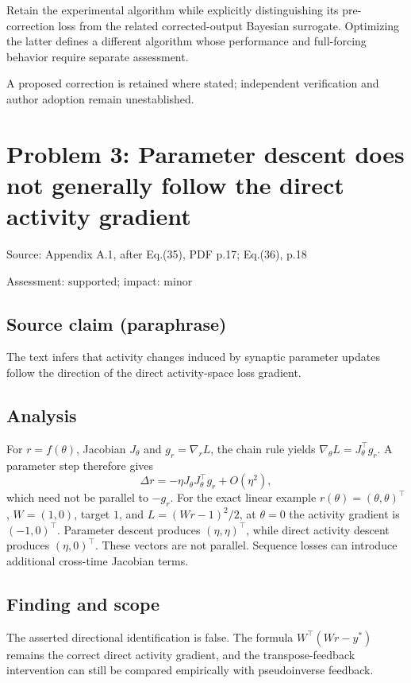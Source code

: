\documentclass[11pt]{article}
\begin{document}
Retain the experimental algorithm while explicitly distinguishing its pre-correction loss from the related corrected-output Bayesian surrogate. Optimizing the latter defines a different algorithm whose performance and full-forcing behavior require separate assessment.

A proposed correction is retained where stated; independent verification and author adoption remain unestablished.

\section*{Problem 3: Parameter descent does not generally follow the direct activity gradient}

Source: Appendix A.1, after Eq.(35), PDF p.17; Eq.(36), p.18

Assessment: supported; impact: minor

\subsection*{Source claim (paraphrase)}

The text infers that activity changes induced by synaptic parameter updates follow the direction of the direct activity-space loss gradient.

\subsection*{Analysis}

For \(r=f(\theta)\), Jacobian \(J_\theta\) and \(g_r=\nabla_rL\), the chain rule yields \(\nabla_\theta L=J_\theta^\top g_r\). A parameter step therefore gives \[\Delta r=-\eta J_\theta J_\theta^\top g_r+O(\eta^2),\] which need not be parallel to \(-g_r\). For the exact linear example \(r(\theta)=(\theta,\theta)^\top\), \(W=(1,0)\), target \(1\), and \(L=(Wr-1)^2/2\), at \(\theta=0\) the activity gradient is \((-1,0)^\top\). Parameter descent produces \((\eta,\eta)^\top\), while direct activity descent produces \((\eta,0)^\top\). These vectors are not parallel. Sequence losses can introduce additional cross-time Jacobian terms.

\subsection*{Finding and scope}

The asserted directional identification is false. The formula \(W^\top(Wr-y^*)\) remains the correct direct activity gradient, and the transpose-feedback intervention can still be compared empirically with pseudoinverse feedback.
\end{document}
